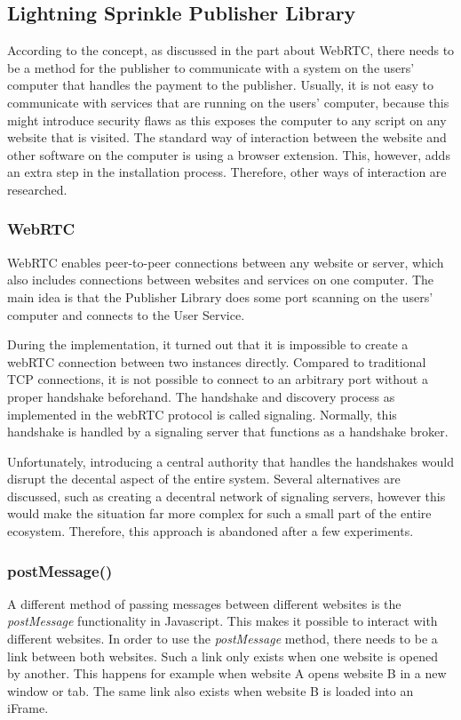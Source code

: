 \subsection{Lightning Sprinkle Publisher Library}
According to the concept, as discussed in the part about WebRTC, there needs to be a method for the publisher to communicate with a system on the users' computer that handles the payment to the publisher. Usually, it is not easy to communicate with services that are running on the users' computer, because this might introduce security flaws as this exposes the computer to any script on any website that is visited. The standard way of interaction between the website and other software on the computer is using a browser extension. This, however, adds an extra step in the installation process. Therefore, other ways of interaction are researched.

\subsubsection{WebRTC}

WebRTC enables peer-to-peer connections between any website or server, which also includes connections between websites and services on one computer. The main idea is that the Publisher Library does some port scanning on the users' computer and connects to the User Service.

During the implementation, it turned out that it is impossible to create a webRTC connection between two instances directly. Compared to traditional TCP connections, it is not possible to connect to an arbitrary port without a proper handshake beforehand. The handshake and discovery process as implemented in the webRTC protocol is called signaling. Normally, this handshake is handled by a signaling server that functions as a handshake broker.

Unfortunately, introducing a central authority that handles the handshakes would disrupt the decental aspect of the entire system. Several alternatives are discussed, such as creating a decentral network of signaling servers, however this would make the situation far more complex for such a small part of the entire ecosystem. Therefore, this approach is abandoned after a few experiments.

\subsubsection{postMessage()}
A different method of passing messages between different websites is the \textit{postMessage} functionality in Javascript. This makes it possible to interact with different websites. In order to use the \textit{postMessage} method, there needs to be a link between both websites. Such a link only exists when one website is opened by another. This happens for example when website A opens website B in a new window or tab. The same link also exists when website B is loaded into an iFrame. 

